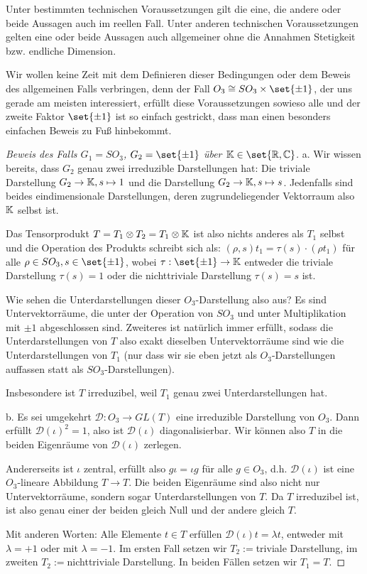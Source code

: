\begin{remark}
Unter bestimmten technischen Voraussetzungen gilt die eine, die andere oder beide Aussagen auch im reellen Fall. Unter anderen technischen Voraussetzungen gelten eine oder beide Aussagen auch allgemeiner ohne die Annahmen Stetigkeit bzw. endliche Dimension.

Wir wollen keine Zeit mit dem Definieren dieser Bedingungen oder dem Beweis des allgemeinen Falls verbringen, denn der Fall $O_3\isomorphic SO_3\times\set{\pm 1}$, der uns gerade am meisten interessiert, erfüllt diese Voraussetzungen sowieso alle und der zweite Faktor $\set{\pm1}$ ist so einfach gestrickt, dass man einen besonders einfachen Beweis zu Fuß hinbekommt.
\end{remark}

\begin{proof}[Beweis des Falls $G_1=SO_3$, $G_2=\set{\pm 1}$ über $\IK\in\set{\IR,\IC}$]
a. Wir wissen bereits, dass $G_2$ genau zwei irreduzible Darstellungen hat: Die triviale Darstellung $G_2\to\mathbb{K}, s\mapsto 1$ und die Darstellung $G_2\to\mathbb{K}, s \mapsto s$. Jedenfalls sind beides eindimensionale Darstellungen, deren zugrundeliegender Vektorraum also $\mathbb{K}$ selbst ist.

Das Tensorprodukt $T=T_1\otimes T_2=T_1\otimes\mathbb{K}$ ist also nichts anderes als $T_1$ selbst und die Operation des Produkts schreibt sich als: $(\rho,s)t_1 = \tau(s)\cdot (\rho t_1)$ für alle $\rho\in SO_3, s\in\set{\pm 1}$, wobei $\tau: \set{\pm 1} \to \IK$ entweder die triviale Darstellung $\tau(s)=1$ oder die nichttriviale Darstellung $\tau(s)=s$ ist.

Wie sehen die Unterdarstellungen dieser $O_3$-Darstellung also aus? Es sind Untervektorräume, die unter der Operation von $SO_3$ und unter Multiplikation mit $\pm 1$ abgeschlossen sind. Zweiteres ist natürlich immer erfüllt, sodass die Unterdarstellungen von $T$ also exakt dieselben Untervektorräume sind wie die Unterdarstellungen von $T_1$ (nur dass wir sie eben jetzt als $O_3$-Darstellungen auffassen statt als $SO_3$-Darstellungen).

Insbesondere ist $T$ irreduzibel, weil $T_1$ genau zwei Unterdarstellungen hat.

\medbreak
b. Es sei umgekehrt $\mathcal{D}: O_3\to GL(T)$ eine irreduzible Darstellung von $O_3$. Dann erfüllt $\mathcal{D}(\iota)^2=1$, also ist $\mathcal{D}(\iota)$ diagonalisierbar. Wir können also $T$ in die beiden Eigenräume von $\mathcal{D}(\iota)$ zerlegen.

Andererseits ist $\iota$ zentral, erfüllt also $g\iota=\iota g$ für alle $g\in O_3$, d.h. $\mathcal{D}(\iota)$ ist eine $O_3$-lineare Abbildung $T\to T$. Die beiden Eigenräume sind also nicht nur Untervektorräume, sondern sogar Unterdarstellungen von $T$. Da $T$ irreduzibel ist, ist also genau einer der beiden gleich Null und der andere gleich $T$.

Mit anderen Worten: Alle Elemente $t\in T$ erfüllen $\mathcal{D}(\iota)t=\lambda t$, entweder mit $\lambda=+1$ oder mit $\lambda=-1$. Im ersten Fall setzen wir $T_2:=$triviale Darstellung, im zweiten $T_2:=$nichttriviale Darstellung. In beiden Fällen setzen wir $T_1=T$.
\end{proof}

